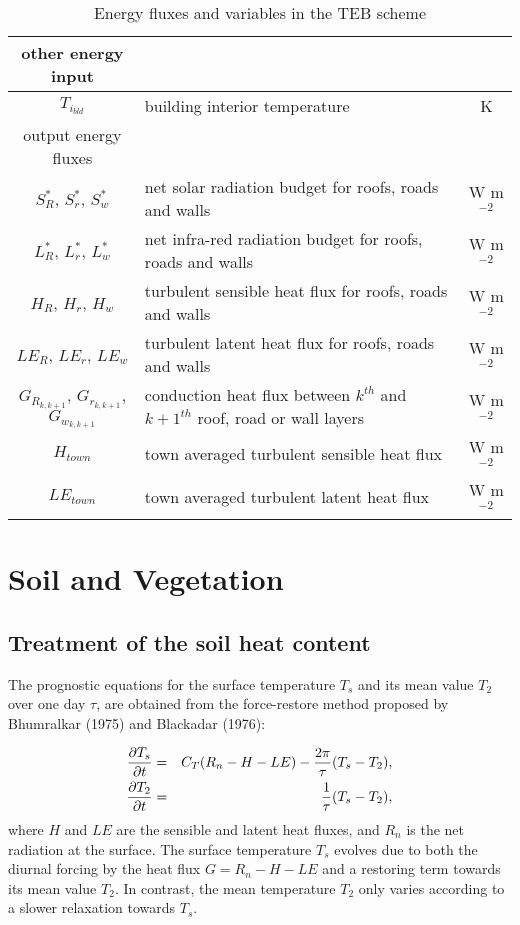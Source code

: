 \begin{table}[h]
{{\begin{tabular}{||c |l |c||}
\hline
other energy input && \\
\hline
$T_{i_{bld}}$  & building interior temperature & K \\
\hline
output energy fluxes && \\
\hline
$S^*_R$, $S^*_r$, $S^*_w$ & net solar radiation budget for roofs, roads and walls & W m$^{-2}$ \\
$L^*_R$, $L^*_r$, $L^*_w$ & net infra-red radiation budget for roofs, roads and walls & W m$^{-2}$ \\
$H_R$, $H_r$, $H_w$ & turbulent sensible heat flux for roofs, roads and walls & W m$^{-2}$ \\
$LE_R$, $LE_r$, $LE_w$ & turbulent latent heat flux for roofs, roads and walls & W m$^{-2}$ \\
$G_{R_{k,k+1}}$, $G_{r_{k,k+1}}$, $G_{w_{k,k+1}}$ & conduction heat flux between $k^{th}$ and $k+1^{th}$ roof,
 road or wall layers & W m$^{-2}$ \\
$H_{town}$ & town averaged turbulent sensible heat flux & W m$^{-2}$ \\
$LE_{town}$ & town averaged turbulent latent heat flux & W m$^{-2}$ \\
\hline
\hline
\end{tabular}
}}
\caption{Energy fluxes and variables in the TEB scheme}
\label{TEB1}
\end{table}
\clearpage
\section{Soil and Vegetation}

\subsection{Treatment of the soil heat content}

The prognostic equations for the surface temperature
$T_s$ and its mean value $T_2$ over one day $\tau$,
are obtained from the force-restore method proposed by
Bhumralkar (1975) and Blackadar (1976):

\begin{eqnarray} \label{eqTs}
{\partial T_s \over \partial t}&=&C_T (R_n-H-LE) -
{2 \pi \over \tau} (T_s-T_2),   \\
{\partial T_2 \over \partial t}&=& {1 \over \tau}
(T_s-T_2),
\end{eqnarray}
where $H$ and
$LE$ are the sensible and latent heat fluxes, and
$R_n$ is the net radiation at the surface.
The surface temperature $T_s$ evolves due to both the
diurnal forcing by the heat flux $G = R_n-H-LE$ and
a restoring term towards its mean value $T_2$.
In contrast, the mean temperature $T_2$ only varies
according to a slower relaxation towards $T_s$.

